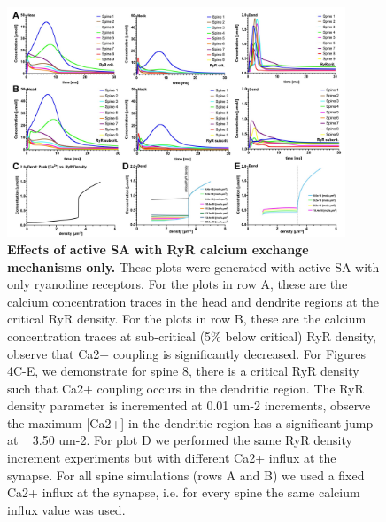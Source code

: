 \documentclass[fleqn,10pt]{wlscirep}
\begin{document}
\begin{figure}[h!]
\centering
\includegraphics[width=0.9\textwidth]{images/figure4.jpg}
\caption{{\small\textbf{Effects of active SA with RyR calcium exchange mechanisms only.} These plots were generated with active SA with only ryanodine receptors. For the plots in row A, these are the calcium concentration traces in the head and dendrite regions at the critical RyR density. For the plots in row B, these are the calcium concentration traces at sub-critical (5\% below critical) RyR density, observe that Ca2+ coupling is significantly decreased. For Figures 4C-E, we demonstrate for spine 8, there is a critical RyR density  such that Ca2+ coupling occurs in the dendritic region. The RyR density parameter is incremented at 0.01 um-2 increments, observe the maximum [Ca2+] in the dendritic region has a significant jump at ~ 3.50 um-2. For plot D we performed the same RyR density increment experiments but with different Ca2+ influx at the synapse. For all spine simulations (rows A and B) we used a fixed Ca2+ influx at the synapse, i.e. for every spine the same calcium influx value was used.}}
\end{figure}
\end{document}
